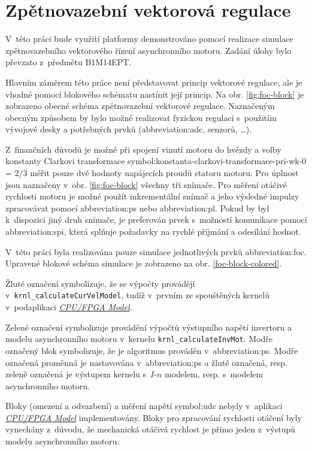 \documentclass[a4paper, twoside, 11pt]{article}
\begin{document}
\section{Zpětnovazební vektorová regulace}
	V~této práci bude využití platformy demonstrováno pomocí realizace simulace zpětnovazebního vektorového řízení asynchronního motoru. Zadání úlohy bylo převzato z~předmětu B1M14EPT. \cite{lipcak-bauer-ept-moodle}\par
	Hlavním záměrem této práce není představovat princip vektorové regulace, ale je vhodné pomocí blokového schématu nastínit její princip. Na obr. \ref{fig:foc-block} je zobrazeno obecné schéma zpětnovazební vektorové regulace. Naznačeným obecným způsobem by bylo možné realizovat fyzickou regulaci s~použitím vývojové desky a potřebných prvků (\gls{abbreviation:adc}, senzorů, \dots).\par
	Z~finančních důvodů je možné při spojení vinutí motoru do hvězdy a volby konstanty Clarkovi transformace \gls{symbol:konstanta-clarkovi-transformace-pri-wk-0} = $2/3$ měřit pouze dvě hodnoty napájecích proudů statoru motoru. Pro úplnost jsou naznačeny v~obr. \ref{fig:foc-block} všechny tři snímače. Pro měření otáčivé rychlosti motoru je možné použít inkrementální snímač a jeho výsledné impulzy zpracovávat pomocí \gls{abbreviation:ps} nebo \gls{abbreviation:pl}. Pokud by byl k~dispozici jiný druh snímače, je preferován prvek s~možností komunikace pomocí \gls{abbreviation:spi}, která splňuje požadavky na rychlé příjmání a odesílání hodnot.\par
	V~této práci byla realizována pouze simulace jednotlivých prvků \gls{abbreviation:foc}. Upravené blokové schéma simulace je zobrazeno na obr. \ref{foc-block-colored}.\par
	\textcolor{ctuyellow}{Žluté označení} symbolizuje, že se výpočty provádějí v~\texttt{krnl\_calculateCurVelModel}, tudíž v~prvním ze spouštěných kernelů v~podaplikaci \hyperref[subsec:cpu-fpga]{\textit{CPU/FPGA Model}}.\par
	\textcolor{ctugreen}{Zelené označení} symbolizuje provádění výpočtů výstupního napětí invertoru a modelu asynchronního motoru v~kernelu \texttt{krnl\_calculateInvMot}. \textcolor{ctublue}{Modře označený} blok symbolizuje, že je algoritmus prováděn v~\gls{abbreviation:ps}. \textcolor{ctublue}{Modře označená} proměnná je nastavována v~\gls{abbreviation:ps} a \textcolor{ctuyellow}{žlutě označená}, resp. \textcolor{ctugreen}{zeleně označená} je výstupem kernelu s~$I$-$n$ modelem, resp. s~modelem asynchronního motoru.\par
	Bloky (omezení a odvazbení) a měření napětí \gls{symbol:udc} nebyly v~aplikaci \hyperref[subsec:cpu-fpga]{\textit{CPU/FPGA Model}} implementovány. Bloky pro zpracování rychlosti otáčení byly vynechány z~důvodu, že mechanická otáčivá rychlost je přímo jeden z~výstupů modelu asynchronního motoru.
\end{document}
